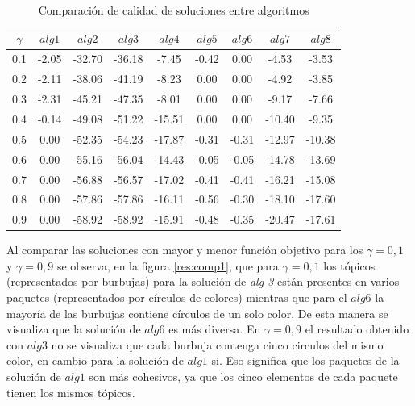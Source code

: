 \begin{table}[H]
\begin{center}
\begin{tabular}{|c|c|c|c|c|c|c|c|c|}
\hline
$\gamma$&$alg1$&$alg2$&$alg3$&$alg4$&$alg5$&$alg6$&$alg7$&$alg8$ \\ \hline
0.1 & -2.05 & -32.70 & -36.18 & -7.45 & -0.42 & 0.00 & -4.53 & -3.53 \\
0.2 & -2.11 & -38.06 & -41.19 & -8.23 & 0.00 & 0.00 & -4.92 & -3.85 \\
0.3 & -2.31 & -45.21 & -47.35 & -8.01 & 0.00 & 0.00 & -9.17 & -7.66 \\
0.4 & -0.14 & -49.08 & -51.22 & -15.51 & 0.00 & 0.00 & -10.40 & -9.35 \\
0.5 & 0.00 & -52.35 & -54.23 & -17.87 & -0.31 & -0.31 & -12.97 & -10.38 \\
0.6 & 0.00 & -55.16 & -56.04 & -14.43 & -0.05 & -0.05 & -14.78 & -13.69 \\
0.7 & 0.00 & -56.88 & -56.57 & -17.02 & -0.41 & -0.41 & -16.21 & -15.08 \\
0.8 & 0.00 & -57.86 & -57.86 & -16.11 & -0.56 & -0.30 & -18.10 & -17.60 \\
0.9 & 0.00 & -58.92 & -58.92 & -15.91 & -0.48 & -0.35 & -20.47 & -17.61 \\ \hline 
\end{tabular}
\caption{Comparación de calidad de soluciones entre algoritmos} 
\label{tabla:comp1}
\end{center}
\end{table}

Al comparar las soluciones con mayor y menor función objetivo para los $\gamma = 0,1$ y $\gamma = 0,9$ se observa, en la figura \ref{res:comp1}, que para $\gamma = 0,1$ los tópicos (representados por burbujas) para la solución de \textit{alg 3} están presentes en varios paquetes (representados por círculos de colores) mientras que para el $alg6$ la mayoría de las burbujas contiene círculos de un solo color. De esta manera se visualiza que la solución de $alg6$ es más diversa. En $\gamma = 0,9$ el resultado obtenido con $alg3$ no se visualiza que cada burbuja contenga cinco circulos del mismo color, en cambio para la solución de $alg1$ si. Eso significa que los paquetes de la solución de $alg1$ son más cohesivos, ya que los cinco elementos de cada paquete tienen los mismos tópicos.

